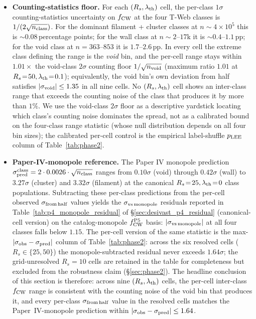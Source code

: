 \documentclass[aps,prd,twocolumn,superscriptaddress,showpacs,preprintnumbers,nofootinbib,longbibliography,floatfix]{revtex4-2}
\begin{document}
\begin{itemize}
\item \textbf{Counting-statistics floor.} For each $(R_s,
\lambda_{\rm th})$ cell, the per-class $1\sigma$ counting-statistics
uncertainty on $f_{\rm CW}$ at the four T-Web classes is
$1/(2\sqrt{n_{\rm class}})$. For the dominant filament + cluster
classes at $n \sim 4 \times 10^5$ this is
$\sim 0.08$\,percentage points; for the wall class at
$n \sim 2$--$17$k it is $\sim 0.4$--$1.1$\,pp; for the void class at
$n = 363$--$853$ it is
$1.7$--$2.6$\,pp. In every cell the extreme class defining the range
is the \emph{void} bin, and the per-cell range stays within
$1.01\times$ the void-class $2\sigma$ counting floor
$1/\sqrt{n_{\rm void}}$ (maximum
ratio $1.01$ at $R_s\!=\!50, \lambda_{\rm th}\!=\!0.1$); equivalently,
the void bin's own deviation from half satisfies
$|\sigma_{\rm void}| \le 1.35$ in all nine cells. No
$(R_s, \lambda_{\rm th})$ cell shows an
inter-class range that exceeds the counting noise of the class that
produces it by more than $1\%$. We use the void-class $2\sigma$ floor
as a descriptive yardstick locating which class's counting noise
dominates the spread, not as a calibrated bound on the four-class
range statistic (whose null distribution depends on all four bin
sizes); the calibrated per-cell control is the empirical
label-shuffle $p_{\rm LEE}$ column of Table~\ref{tab:phase2}.

\item \textbf{Paper-IV-monopole reference.} The Paper IV
monopole prediction $\sigma_{\rm pred}^{\rm class} = 2 \cdot 0.0026
\cdot \sqrt{n_{\rm class}}$ ranges from $0.10\sigma$ (void) through
$0.42\sigma$ (wall) to $3.27\sigma$ (cluster) and $3.32\sigma$
(filament) at the canonical $R_s\!=\!25, \lambda_{\rm th}\!=\!0$
class populations. Subtracting these per-class predictions from the
per-cell observed $\sigma_{\rm from\,half}$ values yields the
$\sigma_{\rm vs\,monopole}$ residuals reported in
Table~\ref{tab:p4_monopole_residual} of \S\ref{sec:desivast_p4_residual}
(canonical-cell version) on the catalog-monopole $f_{\rm CW}^{\rm P5}$
basis: $|\sigma_{\rm vs\,monopole}|$ at all four classes falls
below $1.15$. The per-cell version of the same statistic is the
max-$|\sigma_{\rm obs}-\sigma_{\rm pred}|$ column of
Table~\ref{tab:phase2}: across the six resolved cells ($R_s \in
\{25, 50\}$) the
monopole-subtracted residual never exceeds $1.64\sigma$; the
grid-unresolved $R_s\!=\!10$ cells are retained in the table for
completeness but excluded from the robustness claim
(\S\ref{sec:phase2}). The headline conclusion of
this section is therefore: across nine $(R_s, \lambda_{\rm th})$
cells, the per-cell inter-class $f_{\rm CW}$ range is consistent with
the counting noise of the void bin that produces it, and every
per-class
$\sigma_{\rm from\,half}$ value in the resolved cells matches the Paper~IV-monopole
prediction within
$|\sigma_{\rm obs}-\sigma_{\rm pred}| \le 1.64$.


\end{itemize}
\end{document}
